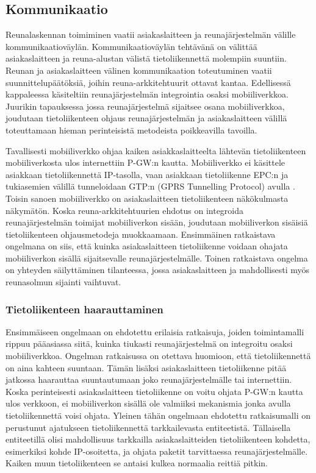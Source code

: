 \subsection{Kommunikaatio}
Reunalaskennan toimiminen vaatii asiakaslaitteen ja reunajärjestelmän välille kommunikaatioväylän.
Kommunikaatioväylän tehtävänä on välittää asiakaslaitteen ja reuna-alustan välistä tietoliikennettä molempiin suuntiin.
Reunan ja asiakaslaitteen välinen kommunikaation toteutuminen vaatii suunnittelupäätöksiä, joihin reuna-arkkitehtuurit ottavat kantaa. 
Edellisessä kappaleessa käsiteltiin reunajärjestelmän integrointia osaksi mobiiliverkkoa. Juurikin tapauksessa jossa reunajärjestelmä sijaitsee osana mobiiliverkkoa, joudutaan tietoliikenteen ohjaus reunajärjestelmän ja asiakaslaitteen välillä toteuttamaan hieman perinteisistä metodeista poikkeavilla tavoilla.

Tavallisesti mobiiliverkko ohjaa kaiken asiakkaslaitteelta lähtevän tietoliikenteen mobiiliverkosta ulos internettiin P-GW:n kautta. 
Mobiiliverkko ei käsittele asiakkaan tietoliikennettä IP-tasolla, vaan asiakkaan tietoliikenne EPC:n ja tukiasemien välillä tunneloidaan GTP:n (GPRS Tunnelling Protocol) avulla \cite{lobillo15scc}.
Toisin sanoen mobiiliverkko on asiakaslaitteen tietoliikenteen näkökulmasta näkymätön.
Koska reuna-arkkitehtuurien ehdotus on integroida reunajärjestelmän toimijat mobiiliverkon sisään, joudutaan mobiiliverkon sisäisiä tietoliikenteen ohjausmetodeja muokkaamaan.
Ensimmäinen ratkaistava ongelmana on siis, että kuinka asiakaslaitteen tietoliikenne voidaan ohajata mobiiliverkon sisällä sijaitsevalle reunajärjestelmälle.
Toinen ratkaistava ongelma on yhteyden säilyttäminen tilanteessa, jossa asiakaslaitteen ja mahdollisesti myös reunasolmun sijainti vaihtuvat.

\subsubsection*{Tietoliikenteen haarauttaminen}
Ensimmäiseen ongelmaan on ehdotettu erilaisia ratkaisuja, joiden toimintamalli rippuu pääasiassa siitä, kuinka tiukasti reunajärjestelmä on integroitu osaksi mobiiliverkkoa.
Ongelman ratkaisussa on otettava huomioon, että tietoliikennettä on aina kahteen suuntaan. Tämän lisäksi asiakaslaitteen tietoliikenne pitää jatkossa haarauttaa suuntautumaan joko reunajärjestelmälle tai internettiin. 
Koska perinteisesti asiakaslaitteen tietoliikenne on voitu ohjata P-GW:n kautta ulos verkkoon, ei mobiiliverkon sisällä ole valmiiksi mekanismia jonka avulla tietoliikennettä voisi ohjata.
Yleinen tähän ongelmaan ehdotettu ratkaisumalli on perustunut ajatukseen tietoliikennettä tarkkailevasta entiteetistä.
Tällaisella entiteetillä olisi mahdollisuus tarkkailla asiakaslaitteiden tietoliikenteen kohdetta, esimerkiksi kohde IP-osoitetta, ja ohjata paketit tarvittaessa reunajärjestelmälle.
Kaiken muun tietoliikenteen se antaisi kulkea normaalia reittiä pitkin.

